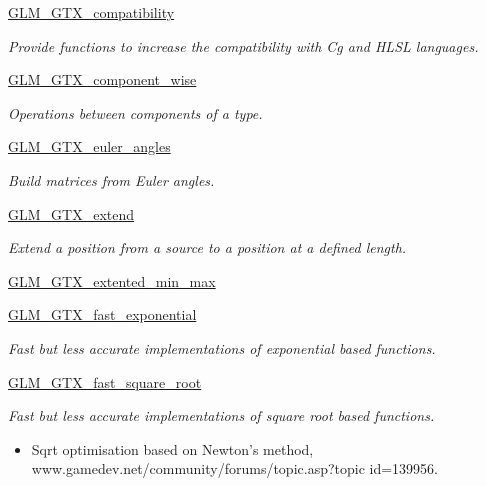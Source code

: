 \begin{CompactItemize}
\item 
\hyperlink{group__gtx__compatibility}{GLM\_\-GTX\_\-compatibility}
\begin{CompactList}\small\item\em Provide functions to increase the compatibility with Cg and HLSL languages. \item\end{CompactList}

\item 
\hyperlink{group__gtx__component__wise}{GLM\_\-GTX\_\-component\_\-wise}
\begin{CompactList}\small\item\em Operations between components of a type. \item\end{CompactList}

\item 
\hyperlink{group__gtx__euler__angles}{GLM\_\-GTX\_\-euler\_\-angles}
\begin{CompactList}\small\item\em Build matrices from Euler angles. \item\end{CompactList}

\item 
\hyperlink{group__gtx__extend}{GLM\_\-GTX\_\-extend}
\begin{CompactList}\small\item\em Extend a position from a source to a position at a defined length. \item\end{CompactList}

\item 
\hyperlink{group__gtx__extented__min__max}{GLM\_\-GTX\_\-extented\_\-min\_\-max}
\item 
\hyperlink{group__gtx__fast__exponential}{GLM\_\-GTX\_\-fast\_\-exponential}
\begin{CompactList}\small\item\em Fast but less accurate implementations of exponential based functions. \item\end{CompactList}

\item 
\hyperlink{group__gtx__fast__square__root}{GLM\_\-GTX\_\-fast\_\-square\_\-root}
\begin{CompactList}\small\item\em Fast but less accurate implementations of square root based functions.\begin{itemize}
\item Sqrt optimisation based on Newton's method, www.gamedev.net/community/forums/topic.asp?topic id=139956. \end{itemize}
\item\end{CompactList}


\end{CompactItemize}

